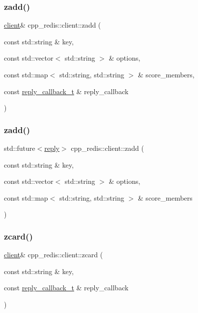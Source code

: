 \subsubsection{\texorpdfstring{zadd()}{zadd()}\hspace{0.1cm}{\footnotesize\ttfamily [1/2]}}
{\footnotesize\ttfamily \hyperlink{classcpp__redis_1_1client}{client}\& cpp\+\_\+redis\+::client\+::zadd (\begin{DoxyParamCaption}\item[{const std\+::string \&}]{key,  }\item[{const std\+::vector$<$ std\+::string $>$ \&}]{options,  }\item[{const std\+::map$<$ std\+::string, std\+::string $>$ \&}]{score\+\_\+members,  }\item[{const \hyperlink{classcpp__redis_1_1client_a061a1140d36d2eaeda82b09a0bb3f9f2}{reply\+\_\+callback\+\_\+t} \&}]{reply\+\_\+callback }\end{DoxyParamCaption})}

\mbox{\label{classcpp__redis_1_1client_a9c6ec329f626304b629c6ff17ea9bc6b}} 
\subsubsection{\texorpdfstring{zadd()}{zadd()}\hspace{0.1cm}{\footnotesize\ttfamily [2/2]}}
{\footnotesize\ttfamily std\+::future$<$\hyperlink{classcpp__redis_1_1reply}{reply}$>$ cpp\+\_\+redis\+::client\+::zadd (\begin{DoxyParamCaption}\item[{const std\+::string \&}]{key,  }\item[{const std\+::vector$<$ std\+::string $>$ \&}]{options,  }\item[{const std\+::map$<$ std\+::string, std\+::string $>$ \&}]{score\+\_\+members }\end{DoxyParamCaption})}

\mbox{\label{classcpp__redis_1_1client_a54259186a650211cc8b5fb70af1384ba}} 
\subsubsection{\texorpdfstring{zcard()}{zcard()}\hspace{0.1cm}{\footnotesize\ttfamily [1/2]}}
{\footnotesize\ttfamily \hyperlink{classcpp__redis_1_1client}{client}\& cpp\+\_\+redis\+::client\+::zcard (\begin{DoxyParamCaption}\item[{const std\+::string \&}]{key,  }\item[{const \hyperlink{classcpp__redis_1_1client_a061a1140d36d2eaeda82b09a0bb3f9f2}{reply\+\_\+callback\+\_\+t} \&}]{reply\+\_\+callback }\end{DoxyParamCaption})}

